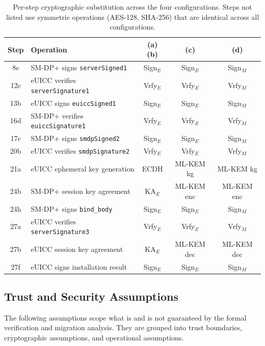 \documentclass[a4paper,fleqn]{cas-sc}
\begin{document}
\begin{table}[!htb]
\caption{Per-step cryptographic substitution across the four
  configurations. Steps not listed use symmetric operations (AES-128,
  SHA-256) that are identical across all configurations.}
\label{tab:substitution}
\centering
\footnotesize
\setlength{\tabcolsep}{3pt}
\renewcommand{\arraystretch}{1.1}
\begin{tabularx}{\columnwidth}{@{}c >{\raggedright\arraybackslash}X ccc@{}}
\toprule
\textbf{Step} & \textbf{Operation} & \textbf{(a)(b)} & \textbf{(c)} & \textbf{(d)} \\
\midrule
8e  & SM-DP+ signs \texttt{serverSigned1}      & Sign$_E$ & Sign$_E$ & Sign$_M$ \\
12c & eUICC verifies \texttt{serverSignature1}  & Vrfy$_E$ & Vrfy$_E$ & Vrfy$_M$ \\
13b & eUICC signs \texttt{euiccSigned1}         & Sign$_E$ & Sign$_E$ & Sign$_M$ \\
16d & SM-DP+ verifies \texttt{euiccSignature1}  & Vrfy$_E$ & Vrfy$_E$ & Vrfy$_M$ \\
17c & SM-DP+ signs \texttt{smdpSigned2}         & Sign$_E$ & Sign$_E$ & Sign$_M$ \\
20b & eUICC verifies \texttt{smdpSignature2}    & Vrfy$_E$ & Vrfy$_E$ & Vrfy$_M$ \\
21a & eUICC ephemeral key generation            & ECDH        & ML-KEM kg  & ML-KEM kg  \\
24b & SM-DP+ session key agreement              & KA$_E$      & ML-KEM enc & ML-KEM enc \\
24h & SM-DP+ signs \texttt{bind\_body}          & Sign$_E$ & Sign$_E$ & Sign$_M$ \\
27a & eUICC verifies \texttt{serverSignature3}  & Vrfy$_E$ & Vrfy$_E$ & Vrfy$_M$ \\
27b & eUICC session key agreement               & KA$_E$      & ML-KEM dec & ML-KEM dec \\
27f & eUICC signs installation result           & Sign$_E$ & Sign$_E$ & Sign$_M$ \\
\bottomrule
\end{tabularx}
\end{table}

\subsection{Trust and Security Assumptions}
\label{sec:sys-assumptions}

The following assumptions scope what is and is not guaranteed by the
formal verification and migration analysis. They are grouped into trust
boundaries, cryptographic assumptions, and operational assumptions.
\end{document}
